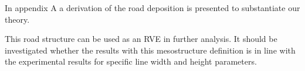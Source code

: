 In appendix A a derivation of the road deposition is presented to substantiate our theory. 

This road structure can be used as an RVE in further analysis. It should be investigated whether the results with this mesostructure definition is in line with the experimental results for specific line width and height parameters.








